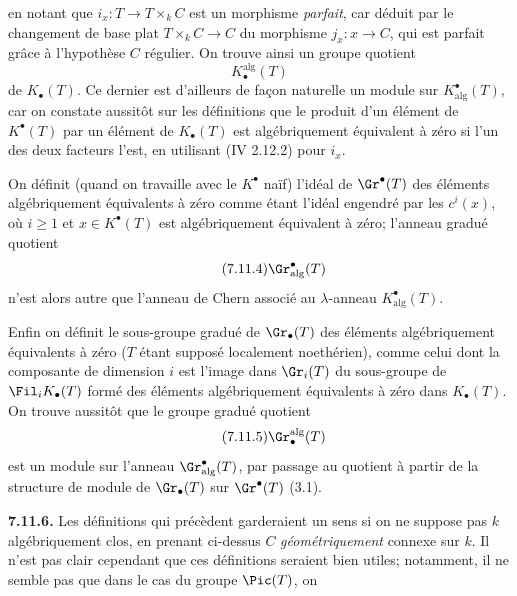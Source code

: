 
en notant que \(i_x:T\to T\times_k C\) est un morphisme \emph{parfait}, car déduit par le changement de base plat \(T\times_k C\to C\) du morphisme \(j_x:x\to C\), qui est parfait grâce à l'hypothèse \(C\) régulier. On trouve ainsi un groupe quotient
\begin{equation}\tag{7.11.3}
  K_\bullet^{\mathrm{alg}}(T)
\end{equation}
de \(K_\bullet(T)\). Ce dernier est d'ailleurs de façon naturelle un module sur \(K^\bullet_{\mathrm{alg}}(T)\), car on constate aussitôt sur les définitions que le produit d'un élément de \(K^\bullet(T)\) par un élément de \(K_\bullet(T)\) est algébriquement équivalent à zéro si l'un des deux facteurs l'est, en utilisant (IV 2.12.2) pour \(i_x\).

On définit (quand on travaille avec le \(K^\bullet\) naïf) l'idéal de \(\Gr^\bullet(T)\) des éléments algébriquement équivalents à zéro comme étant l'idéal engendré par les \(c^i(x)\), où \(i\geq1\) et \(x\in K^\bullet(T)\) est algébriquement équivalent à zéro; l'anneau gradué quotient
\begin{equation}\tag{7.11.4}
  \Gr^\bullet_{\mathrm{alg}}(T)
\end{equation}
n'est alors autre que l'anneau de Chern associé au \(\lambda\)-anneau \(K^\bullet_{\mathrm{alg}}(T)\).

Enfin on définit le sous-groupe gradué de \(\Gr_\bullet(T)\) des éléments algébriquement équivalents à zéro (\(T\) étant supposé localement noethérien), comme celui dont la composante de dimension \(i\) est l'image dans \(\Gr_i(T)\) du sous-groupe de \(\Fil_iK_\bullet(T)\) formé des éléments algébriquement équivalents à zéro dans \(K_\bullet(T)\). On trouve aussitôt que le groupe gradué quotient
\begin{equation}\tag{7.11.5}
  \Gr_\bullet^{\mathrm{alg}}(T)
\end{equation}
est un module sur l'anneau \(\Gr^\bullet_{\mathrm{alg}}(T)\), par passage au quotient à partir de la structure de module de \(\Gr_\bullet(T)\) sur \(\Gr^\bullet(T)\) (3.1).

\textbf{7.11.6.} Les définitions qui précèdent garderaient un sens si on ne suppose pas \(k\) algébriquement clos, en prenant ci-dessus \(C\) \emph{géométriquement} connexe sur \(k\). Il n'est pas clair cependant que ces définitions seraient bien utiles; notamment, il ne semble pas que dans le cas du groupe \(\Pic(T)\), on
